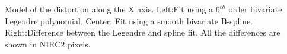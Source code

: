 Model of the distortion along the X axis.  Left:Fit using a $6^{th}$ order bivariate Legendre polynomial.  Center: Fit using a smooth bivariate B-spline. Right:Difference between the Legendre and spline fit.  All the differences are shown in NIRC2 pixels.  \label{dist_x}